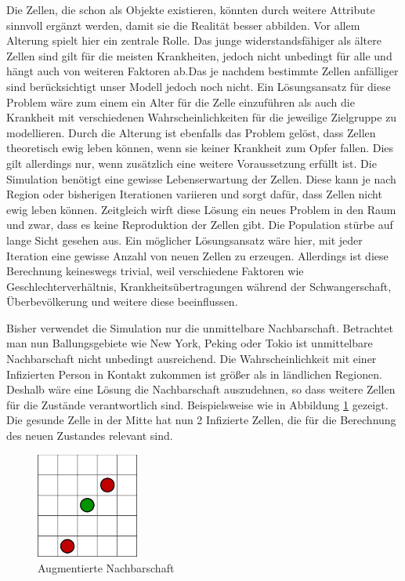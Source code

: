 \documentclass[10pt,twocolumn]{scrartcl}
\begin{document}
Die Zellen, die schon als Objekte existieren, könnten durch weitere Attribute sinnvoll ergänzt werden, damit sie die Realität besser abbilden.
Vor allem Alterung spielt hier ein zentrale Rolle. Das junge widerstandsfähiger als ältere Zellen sind gilt für die meisten Krankheiten, jedoch nicht unbedingt für alle und hängt auch von weiteren Faktoren ab.Das je nachdem bestimmte Zellen anfälliger sind berücksichtigt unser Modell jedoch noch nicht. Ein Lösungsansatz für diese Problem wäre zum einem ein Alter für die Zelle einzuführen als auch die Krankheit mit verschiedenen Wahrscheinlichkeiten für die jeweilige Zielgruppe zu modellieren. 
Durch die Alterung ist  ebenfalls das Problem gelöst, dass Zellen theoretisch ewig leben können, wenn sie keiner Krankheit zum Opfer fallen. Dies gilt allerdings nur, wenn zusätzlich eine weitere Voraussetzung erfüllt ist. Die Simulation benötigt eine gewisse Lebenserwartung der Zellen. Diese kann je nach Region oder bisherigen Iterationen variieren und sorgt dafür, dass Zellen nicht ewig leben können.
Zeitgleich wirft diese Lösung ein neues Problem in den Raum und zwar, dass es keine Reproduktion der Zellen gibt. Die Population stürbe auf lange Sicht gesehen aus. Ein möglicher Lösungsansatz wäre hier, mit jeder Iteration eine gewisse Anzahl von neuen Zellen zu erzeugen. Allerdings ist diese Berechnung keineswegs trivial, weil verschiedene Faktoren wie Geschlechterverhältnis, Krankheitsübertragungen während der Schwangerschaft, Überbevölkerung und weitere diese beeinflussen.

Bisher verwendet die Simulation nur die unmittelbare Nachbarschaft. Betrachtet man nun Ballungsgebiete wie New York, Peking oder Tokio ist unmittelbare Nachbarschaft nicht unbedingt ausreichend. Die Wahrscheinlichkeit mit einer Infizierten Person in Kontakt zukommen ist größer als in ländlichen Regionen. Deshalb wäre eine Lösung die Nachbarschaft auszudehnen, so dass weitere Zellen für die Zustände verantwortlich sind. Beispielsweise wie in Abbildung \ref{fig:ewnachbar} gezeigt. Die gesunde Zelle in der Mitte hat nun 2 Infizierte Zellen, die für die Berechnung des neuen Zustandes relevant sind.

\begin{figure}[H]
	\centering
	\includegraphics[width= 0.3\textwidth]{./images/ewNachbar.pdf}
	\caption{Augmentierte Nachbarschaft}
	\label{fig:ewnachbar}
\end{figure}
\end{document}
